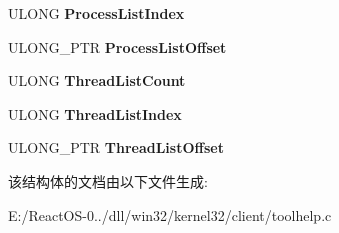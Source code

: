 \begin{DoxyCompactItemize}
U\+L\+O\+NG {\bfseries Process\+List\+Index}
\item 
\mbox{\label{struct___t_h32_s_n_a_p_s_h_o_t_a77cab24fa056958647cd097295adadc9}} 
U\+L\+O\+N\+G\+\_\+\+P\+TR {\bfseries Process\+List\+Offset}
\item 
\mbox{\label{struct___t_h32_s_n_a_p_s_h_o_t_a4173d9f5a0aa31ccbfef6ba58d857963}} 
U\+L\+O\+NG {\bfseries Thread\+List\+Count}
\item 
\mbox{\label{struct___t_h32_s_n_a_p_s_h_o_t_a5f8feef1230eb05eb650efb1aa997e46}} 
U\+L\+O\+NG {\bfseries Thread\+List\+Index}
\item 
\mbox{\label{struct___t_h32_s_n_a_p_s_h_o_t_a3289e46ee3db397bc38f05a925e380d7}} 
U\+L\+O\+N\+G\+\_\+\+P\+TR {\bfseries Thread\+List\+Offset}
\end{DoxyCompactItemize}


该结构体的文档由以下文件生成\+:\begin{DoxyCompactItemize}
\item 
E\+:/\+React\+O\+S-\/0../dll/win32/kernel32/client/toolhelp.\+c\end{DoxyCompactItemize}
